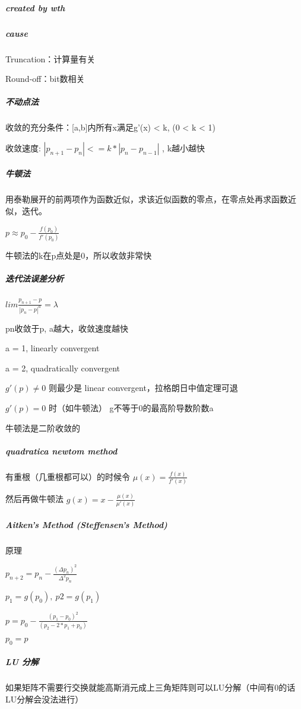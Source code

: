 \documentclass[]{article}
\date{}
\let\oldsubparagraph\subparagraph
\renewcommand{\subparagraph}[1]{\oldsubparagraph{#1}\mbox{}}
\begin{document}
\begin{multicols}{3}
\subparagraph{created by wth}\label{header-c7}
\subparagraph{cause}\label{header-c7}

Truncation：计算量有关

Round-off：bit数相关


\subparagraph{不动点法}\label{header-c23}

收敛的充分条件：{[}a,b{]}内所有x满足\textbar{}g'(x)\textbar{}
\textless{} k, (0 \textless{} k \textless{} 1)

收敛速度: \( |p_{n+1} - p_n| <= k * |p_n - p_{n-1}|\) , k越小越快

\subparagraph{牛顿法}\label{header-c30}

用泰勒展开的前两项作为函数近似，求该近似函数的零点，在零点处再求函数近似，迭代。

\(p \approx p_0 - \frac{f(p_0)}{f'(p_0)}\)

牛顿法的k在p点处是0，所以收敛非常快

\subparagraph{迭代法误差分析}\label{header-c38}

\(lim \frac{p_{n+1} - p}{|p_n - p|^a} = \lambda\)

pn收敛于p, a越大，收敛速度越快

a = 1, linearly convergent

a = 2, quadratically convergent

\( g'(p) \neq 0\) 则最少是 linear convergent，拉格朗日中值定理可退

\( g'(p) = 0\) 时（如牛顿法） g不等于0的最高阶导数阶数a

牛顿法是二阶收敛的

\subparagraph{quadratica newtom method}\label{header-c54}

有重根（几重根都可以）的时候令 \( \mu(x) = \frac{f(x)}{f'(x)} \)

然后再做牛顿法 \( g(x) = x - \frac{\mu(x)}{\mu'(x)} \)

\subparagraph{Aitken's Method (Steffensen's Method)}\label{header-c61}

原理

\(p_{n+2} = p_n - \frac{( \Delta p_n )^2}{ \Delta ^ 2 p_n }\)

\( p_1 = g(p_0),\ p2=g(p_1)\)

\(p=p_0-\frac{(p_1-p_0)^2}{(p_2-2*p_1+p_0)}\)

\(p_0=p\)



\subparagraph{LU 分解}\label{header-c84}

如果矩阵不需要行交换就能高斯消元成上三角矩阵则可以LU分解（中间有0的话LU分解会没法进行）


\end{multicols}
\end{document}
